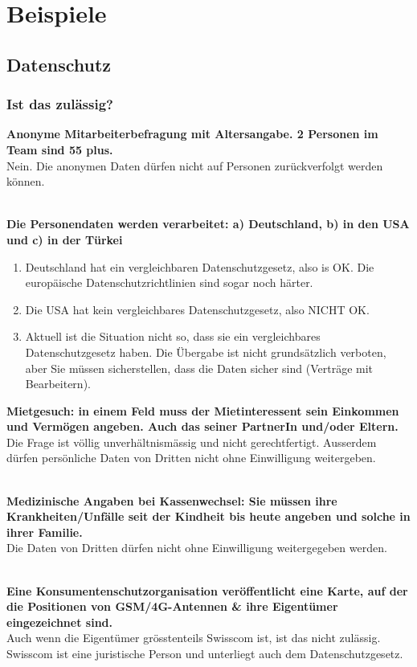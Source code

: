 \section{Beispiele}

\subsection{Datenschutz}

\subsubsection{Ist das zulässig?}

\textbf{Anonyme Mitarbeiterbefragung mit Altersangabe. 2 Personen im
Team sind 55 plus.}\\
Nein. Die anonymen Daten dürfen nicht auf Personen zurückverfolgt werden
können.

\mbox{}\\
\textbf{Die Personendaten werden verarbeitet: a) Deutschland, b) in den
USA und c) in der Türkei}

\begin{enumerate}
	\tightlist
	\item Deutschland hat ein vergleichbaren Datenschutzgesetz, also is OK. Die
	europäische Datenschutzrichtlinien sind sogar noch härter.
	\item Die USA hat kein vergleichbares Datenschutzgesetz, also NICHT OK.
	\item Aktuell ist die Situation nicht so, dass sie ein vergleichbares
	Datenschutzgesetz haben. Die Übergabe ist nicht grundsätzlich
	verboten, aber Sie müssen sicherstellen, dass die Daten sicher sind
	(Verträge mit Bearbeitern).
\end{enumerate}

\textbf{Mietgesuch: in einem Feld muss der Mietinteressent sein
Einkommen und Vermögen angeben. Auch das seiner PartnerIn und/oder
Eltern.}\\
Die Frage ist völlig unverhältnismässig und nicht gerechtfertigt.
Ausserdem dürfen persönliche Daten von Dritten nicht ohne Einwilligung
weitergeben.

\mbox{}\\
\textbf{Medizinische Angaben bei Kassenwechsel: Sie müssen ihre
Krankheiten/Unfälle seit der Kindheit bis heute angeben und solche in
ihrer Familie.}\\
Die Daten von Dritten dürfen nicht ohne Einwilligung weitergegeben
werden.

\mbox{}\\
\textbf{Eine Konsumentenschutzorganisation veröffentlicht eine Karte,
auf der die Positionen von GSM/4G-Antennen \& ihre Eigentümer
eingezeichnet sind.}\\
Auch wenn die Eigentümer grösstenteils Swisscom ist, ist das nicht
zulässig. Swisscom ist eine juristische Person und unterliegt auch dem
Datenschutzgesetz.

